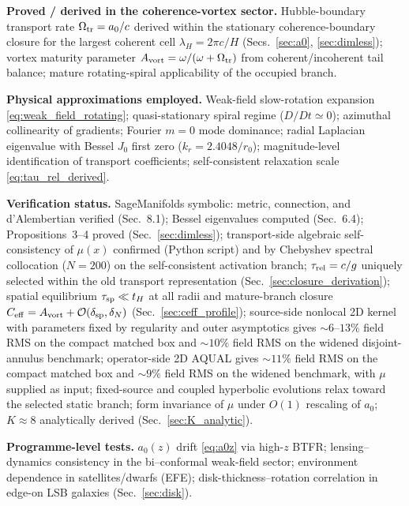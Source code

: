 \documentclass[11pt]{article}
\begin{document}
\medskip
\noindent\textbf{Proved / derived in the coherence-vortex sector.}
Hubble-boundary transport rate $\Omega_{\rm tr}=a_0/c$ derived within the stationary coherence-boundary closure for the largest coherent cell $\lambda_H=2\pi c/H$ (Secs.~\ref{sec:a0}, \ref{sec:dimless}); vortex maturity parameter $A_{\rm vort}=\omega/(\omega+\Omega_{\rm tr})$ from coherent/incoherent tail balance; mature rotating-spiral applicability of the occupied branch.

\medskip
\noindent\textbf{Physical approximations employed.}
Weak-field slow-rotation expansion \eqref{eq:weak_field_rotating}; quasi-stationary spiral regime ($D/Dt \simeq 0$); azimuthal collinearity of gradients; Fourier $m=0$ mode dominance; radial Laplacian eigenvalue with Bessel $J_0$ first zero ($k_r=2.4048/r_0$); magnitude-level identification of transport coefficients; self-consistent relaxation scale \eqref{eq:tau_rel_derived}.

\medskip
\noindent\textbf{Verification status.}
SageManifolds symbolic: metric, connection, and d'Alembertian verified (Sec.~8.1); Bessel eigenvalues computed (Sec.~6.4); Propositions~3--4 proved (Sec.~\ref{sec:dimless}); transport-side algebraic self-consistency of $\mu(x)$ confirmed (Python script) and by Chebyshev spectral collocation ($N=200$) on the self-consistent activation branch; $\tau_{\rm rel}=c/g$ uniquely selected within the old transport representation (Sec.~\ref{sec:closure_derivation}); spatial equilibrium $\tau_{\rm sp}\ll t_H$ at all radii and mature-branch closure $C_{\rm eff}=A_{\rm vort}+\mathcal{O}(\delta_{\rm sp},\delta_N)$ (Sec.~\ref{sec:ceff_profile}); source-side nonlocal 2D kernel with parameters fixed by regularity and outer asymptotics gives $\sim6$--$13\%$ field RMS on the compact matched box and $\sim10\%$ field RMS on the widened disjoint-annulus benchmark; operator-side 2D AQUAL gives $\sim11\%$ field RMS on the compact matched box and $\sim9\%$ field RMS on the widened benchmark, with $\mu$ supplied as input; fixed-source and coupled hyperbolic evolutions relax toward the selected static branch; form invariance of $\mu$ under $O(1)$ rescaling of $a_0$; $K\approx 8$ analytically derived (Sec.~\ref{sec:K_analytic}).

\medskip
\noindent\textbf{Programme-level tests.}
$a_0(z)$ drift \eqref{eq:a0z} via high-$z$ BTFR; lensing--dynamics consistency in the bi--conformal weak-field sector; environment dependence in satellites/dwarfs (EFE); disk-thickness--rotation correlation in edge-on LSB galaxies (Sec.~\ref{sec:disk}).
\end{document}
